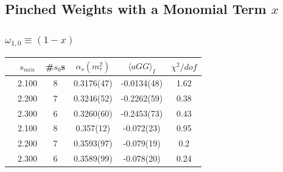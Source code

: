 \documentclass[fleqn]{beamer}
\begin{document}
\subsection{Pinched Weights with a Monomial Term \(x\)}
\begin{frame}
  \frametitle{\(\omega_{1,0} \equiv (1-x)\)}
  \centering
  \begin{tabular}{cccccc}
    \toprule
    & \(s_{min}\) & \#\(s_0\)s & \(\alpha_s(m_\tau^2)\) & \(\langle aGG \rangle_I\) & \(\chi^2/dof\)  \\
    \midrule
    \parbox[t]{2mm}{}
    & 2.100 & 8 & 0.3176(47) & -0.0134(48) & 1.62 \\
    & 2.200 & 7 & 0.3246(52) & -0.2262(59) & 0.38 \\
    & 2.300 & 6 & 0.3260(60) & -0.2453(73) & 0.43 \\
    \midrule
    \parbox[t]{2mm}{}
    & 2.100 & 8  & 0.357(12) & -0.072(23) & 0.95 \\
    & 2.200 & 7 &  0.3593(97) & -0.079(19) & 0.2 \\
    & 2.300 & 6 & 0.3589(99) & -0.078(20) & 0.24 \\
    \bottomrule
  \end{tabular}
\end{frame}
\end{document}
